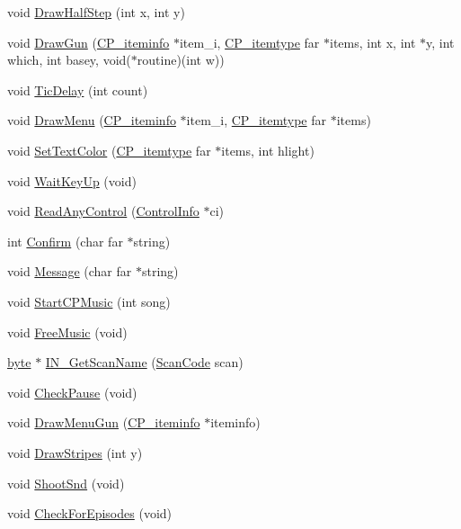 \begin{DoxyCompactItemize}
\item 
void \hyperlink{WL__MENU_8C_ad838539ffa52a66afa3fc9d4ce9bef29}{DrawHalfStep} (int x, int y)
\item 
void \hyperlink{WL__MENU_8C_aa2214b22585686a8992038d77d4dbd3c}{DrawGun} (\hyperlink{structCP__iteminfo}{CP\_\-iteminfo} $\ast$item\_\-i, \hyperlink{structCP__itemtype}{CP\_\-itemtype} far $\ast$items, int x, int $\ast$y, int which, int basey, void($\ast$routine)(int w))
\item 
void \hyperlink{WL__MENU_8C_a4f5f54a27864fe7144f735c2d3529774}{TicDelay} (int count)
\item 
void \hyperlink{WL__MENU_8C_ad7ae5f8d3bfaf8e94d9c3fd004609229}{DrawMenu} (\hyperlink{structCP__iteminfo}{CP\_\-iteminfo} $\ast$item\_\-i, \hyperlink{structCP__itemtype}{CP\_\-itemtype} far $\ast$items)
\item 
void \hyperlink{WL__MENU_8C_a604ee41d936e798d09c96e1e0895a983}{SetTextColor} (\hyperlink{structCP__itemtype}{CP\_\-itemtype} far $\ast$items, int hlight)
\item 
void \hyperlink{WL__MENU_8C_a3434990df52efeb93017e54af5a20860}{WaitKeyUp} (void)
\item 
void \hyperlink{WL__MENU_8C_a203c5a4b291ebd6bf7b0fb11b5905e6c}{ReadAnyControl} (\hyperlink{structCursorInfo}{ControlInfo} $\ast$ci)
\item 
int \hyperlink{WL__MENU_8C_a03f63a618731c692b7496b92fa2002bd}{Confirm} (char far $\ast$string)
\item 
void \hyperlink{WL__MENU_8C_a42108cf0eef44550e9428222e11de2a3}{Message} (char far $\ast$string)
\item 
void \hyperlink{WL__MENU_8C_a4f6ff7d7af8823a0cd9a4a7217a151de}{StartCPMusic} (int song)
\item 
void \hyperlink{WL__MENU_8C_a1e085748196b850e596a89416216f735}{FreeMusic} (void)
\item 
\hyperlink{ID__HEAD_8H_a0c8186d9b9b7880309c27230bbb5e69d}{byte} $\ast$ \hyperlink{WL__MENU_8C_a7d2fccc459053e010fbafc4f23a8e255}{IN\_\-GetScanName} (\hyperlink{ID__IN_8H_a92ee9291fc7e992c1662c4e195242f2d}{ScanCode} scan)
\item 
void \hyperlink{WL__MENU_8C_a091147f2346aaad8a89508a27b711c3f}{CheckPause} (void)
\item 
void \hyperlink{WL__MENU_8C_a90a65e74d80272f0305d2537870c10ef}{DrawMenuGun} (\hyperlink{structCP__iteminfo}{CP\_\-iteminfo} $\ast$iteminfo)
\item 
void \hyperlink{WL__MENU_8C_a81a9dfc7b2dab1a015d6be0c329e094b}{DrawStripes} (int y)
\item 
void \hyperlink{WL__MENU_8C_a5dd49cf82c780b8d761f20d9af4771e9}{ShootSnd} (void)
\item 
void \hyperlink{WL__MENU_8C_ad57118b3592a6be117bc85d1418bb6b9}{CheckForEpisodes} (void)
\end{DoxyCompactItemize}
